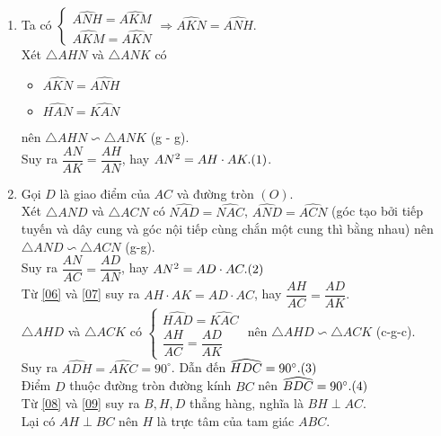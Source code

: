 \begin{ex}
{\begin{enumerate}
	Theo chứng minh ở câu $a)$ thì năm điểm $M, K, N, O, A$ cùng thuộc một đường tròn nên ta có tứ giác $AMKN$ nội tiếp. $\refstepcounter{equation}\hfill (\theequation)\label{05}$\\
	Từ \eqref{04} và \eqref{05} suy ra $\widehat{AKM} = \widehat{AKN}$ (các góc nội tiếp cùng chắn các cung bằng nhau thì bằng nhau).\\
	Vậy $KA$ là tia phân giác của $\widehat{MKN}$.
	\item Ta có $\begin{cases}
	\widehat{ANH} = \widehat{AKM} \\ \widehat{AKM} = \widehat{AKN}
	\end{cases} 
	\Rightarrow \widehat{AKN} = \widehat{ANH}	$.\\
Xét $\triangle AHN$ và $\triangle ANK$ có
\begin{itemize}
	\item $\widehat{AKN} = \widehat{ANH}$
	\item $\widehat{HAN} = \widehat{KAN}$
\end{itemize}
nên $\triangle AHN \backsim \triangle ANK$ (g - g).\\
Suy ra $\dfrac{AN}{AK} = \dfrac{AH}{AN}$, hay $AN^2 = AH \cdot AK. \refstepcounter{equation}\hfill (\theequation)\label{06}$.
\item Gọi $D$ là giao điểm của $AC$ và đường tròn $(O)$.\\
Xét $\triangle AND$ và $\triangle ACN$ có $\widehat{NAD} = \widehat{NAC}$, $\widehat{AND} = \widehat{ACN}$ (góc tạo bởi tiếp tuyến và dây cung và góc nội tiếp cùng chắn một cung thì bằng nhau) nên $\triangle AND \backsim \triangle ACN$ (g-g).\\ Suy ra $\dfrac{AN}{AC} = \dfrac{AD}{AN}$, hay $AN^2 = AD \cdot AC. \refstepcounter{equation}\hfill (\theequation)\label{07}$\\
Từ \eqref{06} và \eqref{07} suy ra $AH \cdot AK = AD \cdot AC$, hay $\dfrac{AH}{AC} = \dfrac{AD}{AK}$.\\
$\triangle AHD$ và $\triangle ACK$ có $\begin{cases}
\widehat{HAD} = \widehat{KAC}\\ \dfrac{AH}{AC} = \dfrac{AD}{AK}
\end{cases}$ nên $\triangle AHD \backsim \triangle ACK$ (c-g-c).\\
Suy ra $\widehat{ADH} = \widehat{AKC} = 90^\circ$. Dẫn đến $\widehat{HDC} = 90^\circ. \refstepcounter{equation}\hfill (\theequation)\label{08}$\\
Điểm $D$ thuộc đường tròn đường kính $BC$ nên $\widehat{BDC} = 90^\circ. \refstepcounter{equation}\hfill (\theequation)\label{09}$\\
Từ \eqref{08} và \eqref{09} suy ra $B,H,D$ thẳng hàng, nghĩa là $BH \perp AC$.\\ Lại có $AH \perp BC$ nên $H$ là trực tâm của tam giác $ABC$.
\end{enumerate}
}
\end{ex}



